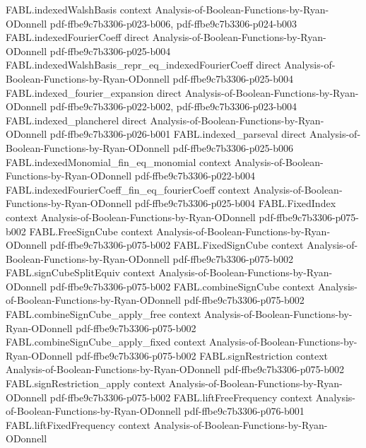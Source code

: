 \begin{theorem}
\proofstep
  {FABL.indexedWalshBasis}
  {context}
  {Analysis-of-Boolean-Functions-by-Ryan-ODonnell}
  {pdf-ffbe9c7b3306-p023-b006,
    pdf-ffbe9c7b3306-p024-b003}
\proofstep
  {FABL.indexedFourierCoeff}
  {direct}
  {Analysis-of-Boolean-Functions-by-Ryan-ODonnell}
  {pdf-ffbe9c7b3306-p025-b004}
\proofstep
  {FABL.indexedWalshBasis_repr_eq_indexedFourierCoeff}
  {direct}
  {Analysis-of-Boolean-Functions-by-Ryan-ODonnell}
  {pdf-ffbe9c7b3306-p025-b004}
\proofstep
  {FABL.indexed_fourier_expansion}
  {direct}
  {Analysis-of-Boolean-Functions-by-Ryan-ODonnell}
  {pdf-ffbe9c7b3306-p022-b002,
    pdf-ffbe9c7b3306-p023-b004}
\proofstep
  {FABL.indexed_plancherel}
  {direct}
  {Analysis-of-Boolean-Functions-by-Ryan-ODonnell}
  {pdf-ffbe9c7b3306-p026-b001}
\proofstep
  {FABL.indexed_parseval}
  {direct}
  {Analysis-of-Boolean-Functions-by-Ryan-ODonnell}
  {pdf-ffbe9c7b3306-p025-b006}
\proofstep
  {FABL.indexedMonomial_fin_eq_monomial}
  {context}
  {Analysis-of-Boolean-Functions-by-Ryan-ODonnell}
  {pdf-ffbe9c7b3306-p022-b004}
\proofstep
  {FABL.indexedFourierCoeff_fin_eq_fourierCoeff}
  {context}
  {Analysis-of-Boolean-Functions-by-Ryan-ODonnell}
  {pdf-ffbe9c7b3306-p025-b004}
\proofstep
  {FABL.FixedIndex}
  {context}
  {Analysis-of-Boolean-Functions-by-Ryan-ODonnell}
  {pdf-ffbe9c7b3306-p075-b002}
\proofstep
  {FABL.FreeSignCube}
  {context}
  {Analysis-of-Boolean-Functions-by-Ryan-ODonnell}
  {pdf-ffbe9c7b3306-p075-b002}
\proofstep
  {FABL.FixedSignCube}
  {context}
  {Analysis-of-Boolean-Functions-by-Ryan-ODonnell}
  {pdf-ffbe9c7b3306-p075-b002}
\proofstep
  {FABL.signCubeSplitEquiv}
  {context}
  {Analysis-of-Boolean-Functions-by-Ryan-ODonnell}
  {pdf-ffbe9c7b3306-p075-b002}
\proofstep
  {FABL.combineSignCube}
  {context}
  {Analysis-of-Boolean-Functions-by-Ryan-ODonnell}
  {pdf-ffbe9c7b3306-p075-b002}
\proofstep
  {FABL.combineSignCube_apply_free}
  {context}
  {Analysis-of-Boolean-Functions-by-Ryan-ODonnell}
  {pdf-ffbe9c7b3306-p075-b002}
\proofstep
  {FABL.combineSignCube_apply_fixed}
  {context}
  {Analysis-of-Boolean-Functions-by-Ryan-ODonnell}
  {pdf-ffbe9c7b3306-p075-b002}
\proofstep
  {FABL.signRestriction}
  {context}
  {Analysis-of-Boolean-Functions-by-Ryan-ODonnell}
  {pdf-ffbe9c7b3306-p075-b002}
\proofstep
  {FABL.signRestriction_apply}
  {context}
  {Analysis-of-Boolean-Functions-by-Ryan-ODonnell}
  {pdf-ffbe9c7b3306-p075-b002}
\proofstep
  {FABL.liftFreeFrequency}
  {context}
  {Analysis-of-Boolean-Functions-by-Ryan-ODonnell}
  {pdf-ffbe9c7b3306-p076-b001}
\proofstep
  {FABL.liftFixedFrequency}
  {context}
  {Analysis-of-Boolean-Functions-by-Ryan-ODonnell}

\end{theorem}
